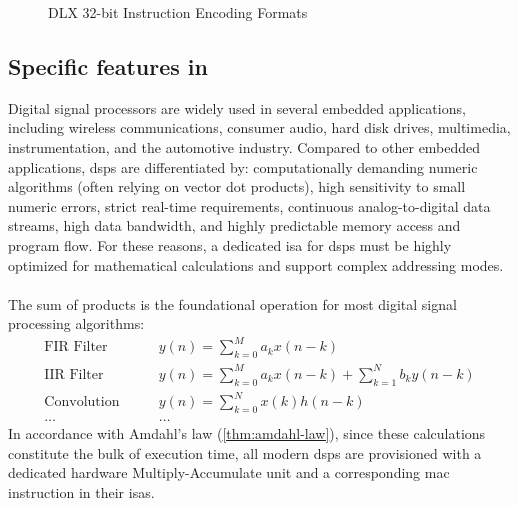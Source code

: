 \begin{figure}[!htbp]
    \caption{DLX 32-bit Instruction Encoding Formats}
    \label{fig:dlx-encoding}
\end{figure}

\subsection{Specific  features in }
Digital signal processors are widely used in several embedded applications, including wireless communications, consumer audio, hard disk drives, multimedia, instrumentation, and the automotive industry. Compared to other embedded applications, \glspl{dsp} are differentiated by: computationally demanding numeric algorithms (often relying on vector dot products), high sensitivity to small numeric errors, strict real-time requirements, continuous analog-to-digital data streams, high data bandwidth, and highly predictable memory access and program flow. For these reasons, a dedicated \gls{isa} for \glspl{dsp} must be highly optimized for mathematical calculations and support complex addressing modes.

\paragraph{} 
The sum of products is the foundational operation for most digital signal processing algorithms:
\[
\begin{aligned}
    \text{FIR Filter} &\qquad y(n) = \sum_{k=0}^M a_k x(n-k)\\
    \text{IIR Filter} &\qquad y(n) = \sum_{k=0}^M a_k x(n-k) + \sum_{k=1}^N b_k y(n-k)\\
    \text{Convolution} &\qquad y(n) = \sum_{k=0}^N x(k) h(n-k)\\
    \dots&\qquad\dots
\end{aligned}
\]
In accordance with Amdahl's law (\cref{thm:amdahl-law}), since these calculations constitute the bulk of execution time, all modern \glspl{dsp} are provisioned with a dedicated hardware Multiply-Accumulate unit and a corresponding \gls{mac} instruction in their \glspl{isa}.

